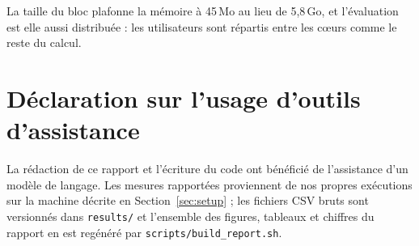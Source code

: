 \documentclass[11pt,a4paper]{article}
\begin{document}
La taille du bloc plafonne la mémoire à 45\,Mo au lieu de 5,8\,Go, et l'évaluation est
elle aussi distribuée : les utilisateurs sont répartis entre les cœurs comme le reste du
calcul.





\section*{Déclaration sur l'usage d'outils d'assistance}
\noindent
La rédaction de ce rapport et l'écriture du code ont bénéficié de l'assistance d'un
modèle de langage. Les mesures rapportées proviennent de nos propres exécutions sur la
machine décrite en Section~\ref{sec:setup} ; les fichiers CSV bruts sont versionnés dans
\texttt{results/} et l'ensemble des figures, tableaux et chiffres du rapport en est
regénéré par \texttt{scripts/build\_report.sh}.





\end{document}
